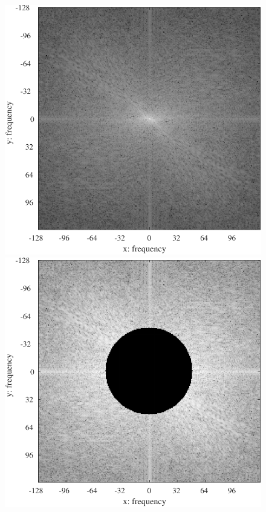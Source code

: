 \begin{figure}[H]
\begin{minipage}[b]{.23\textwidth}
    \end{minipage}
    \begin{minipage}[b]{.23\textwidth}
        \centering
        \includegraphics[keepaspectratio,width=\textwidth]{../../Figures/08_42_fft.pdf}
    \end{minipage}
    \begin{minipage}[b]{.23\textwidth}
        \centering
        \includegraphics[keepaspectratio,width=\textwidth]{../../Figures/08_43_fft-filter.pdf}

\end{minipage}
\end{figure}
